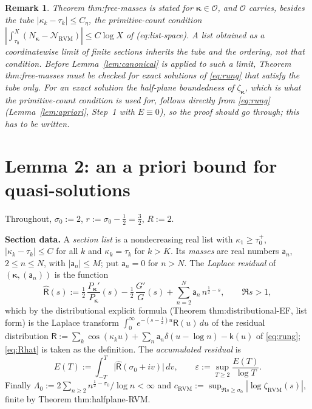 \documentclass[11pt]{article}
\newtheorem{remark}{Remark}
\newcommand{\RVM}{\mathrm{RVM}}
\newcommand{\NR}{\mathcal N_{\RVM}}
\begin{document}
\begin{remark}
Theorem thm:free-masses is stated for $\boldsymbol\kappa\in\mathscr O$, and $\mathscr O$ carries, besides the tube $|\kappa_k-\tau_k|\le C_\eta$, the primitive-count condition $|\int_{\tau_0}^X(N_{\boldsymbol\kappa}-\NR)|\le C\log X$ of (eq:list-space). A list obtained as a coordinatewise limit of finite sections inherits the tube and the ordering, not that condition. Before Lemma~\ref{lem:canonical} is applied to such a limit, Theorem thm:free-masses must be checked for exact solutions of \eqref{eq:rung} that satisfy the tube only. For an exact solution the half-plane boundedness of $\zeta_{\boldsymbol\kappa}$, which is what the primitive-count condition is used for, follows directly from \eqref{eq:rung} (Lemma~\ref{lem:apriori}, Step~1 with $E\equiv0$), so the proof should go through; this has to be written.
\end{remark}

\section*{Lemma 2: an a priori bound for quasi-solutions}

Throughout, $\sigma_0:=2$, $r:=\sigma_0-\frac12=\frac32$, $R:=2$.

\medskip\noindent\textbf{Section data.} A \emph{section list} is a nondecreasing real list with $\kappa_1\ge\tau_0^+$, $|\kappa_k-\tau_k|\le C$ for all $k$ and $\kappa_k=\tau_k$ for $k>K$. Its \emph{masses} are real numbers $\mathsf a_n$, $2\le n\le N$, with $|\mathsf a_n|\le M$; put $\mathsf a_n=0$ for $n>N$. The \emph{Laplace residual} of $(\boldsymbol\kappa,(\mathsf a_n))$ is the function
\begin{equation}\label{eq:Rhat}
 \widehat{\mathsf R}(s):=\tfrac12\,\frac{P_{\boldsymbol\kappa}'}{P_{\boldsymbol\kappa}}(s)-\tfrac12\,\frac{G'}{G}(s)+\sum_{n=2}^{N}\mathsf a_n\,n^{\frac12-s},\qquad \Re s>1,
\end{equation}
which by the distributional explicit formula (Theorem thm:distributional-EF, list form) is the Laplace transform $\int_0^\infty e^{-(s-\frac12)u}\mathsf R(u)\,du$ of the residual distribution $\mathsf R:=\sum_k\cos(\kappa_ku)+\sum_n\mathsf a_n\delta(u-\log n)-\mathsf k(u)$ of \eqref{eq:rung}; \eqref{eq:Rhat} is taken as the definition. The \emph{accumulated residual} is
\begin{equation}\label{eq:E}
 E(T):=\int_{-T}^{T}\bigl|\widehat{\mathsf R}(\sigma_0+iv)\bigr|\,dv,\qquad
 \varepsilon:=\sup_{T\ge2}\frac{E(T)}{\log T}.
\end{equation}
Finally $\Lambda_0:=2\sum_{n\ge2}n^{\frac12-\sigma_0}/\log n<\infty$ and $c_{\RVM}:=\sup_{\Re s\ge\sigma_0}|\log\zeta_{\RVM}(s)|$, finite by Theorem thm:halfplane-RVM.
\end{document}

